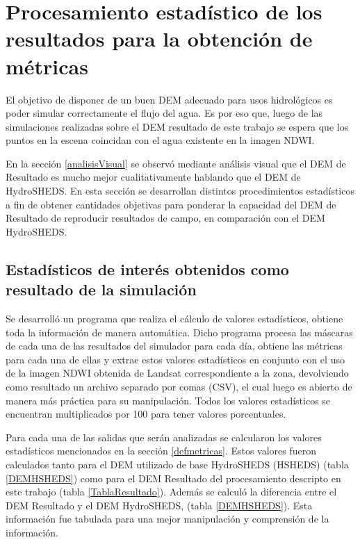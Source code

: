 \documentclass[10pt,a4paper, twoside]{report}
\begin{document}
\section{Procesamiento estadístico de los resultados para la obtención de métricas}

El objetivo de disponer de un buen DEM adecuado para usos hidrológicos es poder simular correctamente el flujo del agua. Es por eso que, luego de las simulaciones realizadas sobre el DEM resultado de este trabajo se espera que los puntos en la escena coincidan con el agua existente en la imagen NDWI.

En la sección \ref{analisisVisual} se observó mediante análisis visual que el DEM de Resultado es mucho mejor cualitativamente hablando que el DEM de HydroSHEDS. En esta sección se desarrollan distintos procedimientos estadísticos a fin de obtener cantidades objetivas para ponderar la capacidad del DEM de Resultado de reproducir resultados de campo, en comparación con el DEM HydroSHEDS.  


\subsection{Estadísticos de interés obtenidos como resultado de la simulación}


Se desarrolló un programa que realiza el cálculo de valores estadísticos, obtiene toda la información de manera automática. Dicho programa procesa las máscaras de cada una de las resultados del simulador para cada día, obtiene las métricas para cada una de ellas y extrae estos valores estadísticos en conjunto con el uso de la imagen NDWI obtenida de Landsat correspondiente a la zona, devolviendo como resultado un archivo separado por comas (CSV), el cual luego es abierto de manera más práctica para su manipulación. Todos los valores estadísticos se encuentran multiplicados por 100 para tener valores porcentuales.

Para cada una de las salidas que serán analizadas se calcularon los valores estadísticos mencionados en la sección \ref{defmetricas}. Estos valores fueron calculados tanto para el DEM utilizado de base HydroSHEDS (HSHEDS) (tabla \ref{DEMHSHEDS}) como para el DEM Resultado del procesamiento descripto en este trabajo (tabla \ref{TablaResultado}). Además se calculó la diferencia entre el DEM Resultado y el DEM HydroSHEDS, (tabla \ref{DEMHSHEDS}). Esta información fue tabulada para una mejor manipulación y comprensión de la información.
\end{document}
